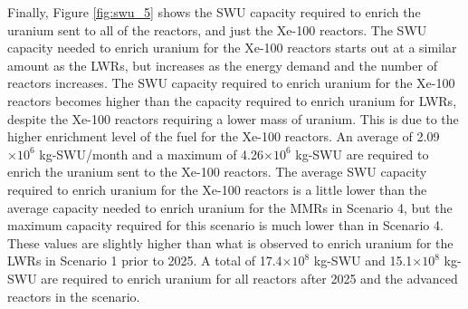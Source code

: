Finally, Figure \ref{fig:swu_5} shows the \gls{SWU} capacity required
to enrich the uranium sent to all of the reactors, and just the Xe-100
reactors. The \gls{SWU} capacity needed 
to enrich uranium for the Xe-100 reactors starts out at a similar 
amount as the \glspl{LWR}, but 
increases as the energy demand and the number of reactors increases. 
The \gls{SWU} capacity required to enrich uranium 
for the Xe-100 reactors becomes higher than the capacity 
required to enrich uranium for \glspl{LWR}, despite the Xe-100 
reactors requiring a lower mass of uranium. This is due to the higher 
enrichment level of the fuel for the Xe-100 reactors. An average of 
2.09$\times 10^6$ kg-\gls{SWU}/month and a maximum of 
4.26$\times 10^6$ kg-\gls{SWU} are required to enrich the uranium sent 
to the Xe-100 reactors. The average \gls{SWU} capacity 
required to enrich uranium for the Xe-100 reactors is a little lower 
than the average capacity needed to enrich uranium for the \glspl{MMR}
in Scenario 4, but the maximum capacity required for this scenario is much 
lower than in Scenario 4. These values are slightly higher 
than what is observed to enrich uranium for the \glspl{LWR} in Scenario 1
prior to 2025. A total of 17.4$\times 10^8$ kg-SWU and 15.1$\times 10^8$
kg-SWU are required to enrich uranium for all reactors after 2025 and the advanced 
reactors in the scenario.  

